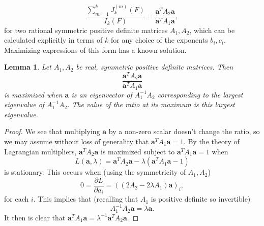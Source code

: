 \documentclass[12pt,a4paper]{amsart}
\theoremstyle{plain}
\newtheorem{lmm}[thrm]{Lemma}
\numberwithin{sblmm}{thrm}
\numberwithin{equation}{section}
\begin{document}
\begin{equation}
\frac{\sum_{m=1}^k J_k^{(m)}(F)}{I_k(F)}=\frac{\mathbf{a}^T A_2 \mathbf{a}}{\mathbf{a}^T A_1 \mathbf{a}},
\end{equation}
for two rational symmetric positive definite matrices $A_1,A_2$, which can be calculated explicitly in terms of $k$ for any choice of the exponents $b_i,c_i$. Maximizing expressions of this form has a known solution.
\begin{lmm}
Let $A_1,A_2$ be real, symmetric positive definite matrices. Then
\[\frac{\mathbf{a}^T A_2 \mathbf{a}}{\mathbf{a}^T A_1 \mathbf{a}}\]
is maximized when $\mathbf{a}$ is an eigenvector of $A_1^{-1}A_2$ corresponding to the largest eigenvalue of $A_1^{-1}A_2$. The value of the ratio at its maximum is this largest eigenvalue.
\end{lmm}
\begin{proof}
We see that multiplying $\mathbf{a}$ by a non-zero scalar doesn't change the ratio, so we may assume without loss of generality that $\mathbf{a}^TA_1\mathbf{a}=1$. By the theory of Lagrangian multipliers, $\mathbf{a}^TA_2\mathbf{a}$ is maximized subject to $\mathbf{a}^TA_1\mathbf{a}=1$ when
\begin{equation}
L(\mathbf{a},\lambda)=\mathbf{a}^T A_2\mathbf{a}-\lambda(\mathbf{a}^TA_1\mathbf{a}-1)
\end{equation}
is stationary. This occurs when (using the symmetricity of $A_1,A_2$)
\begin{equation}
0=\frac{\partial L}{\partial a_i}=((2A_2-2\lambda A_1)\mathbf{a})_i,
\end{equation}
for each $i$. This implies that (recalling that $A_1$ is positive definite so invertible)
\begin{equation}
A_1^{-1}A_2\mathbf{a}=\lambda\mathbf{a}.
\end{equation}
It then is clear that $\mathbf{a}^TA_1\mathbf{a}=\lambda^{-1}\mathbf{a}^T A_2\mathbf{a}$.
\end{proof}
\end{document}
